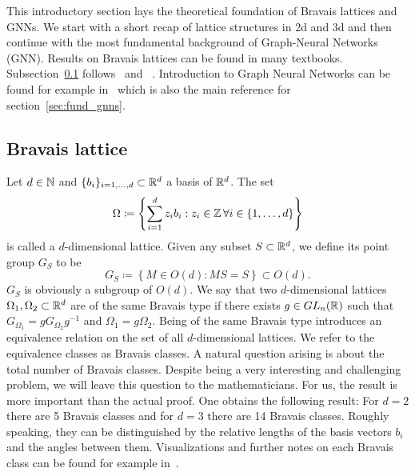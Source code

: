 This introductory section lays the theoretical foundation of Bravais lattices and GNNs. 
We start with a short recap of lattice structures in 2d and 3d and then continue with 
the most fundamental background of Graph-Neural Networks (GNN). 
Results on Bravais lattices can be found in many textbooks. Subsection~\ref{sec:brav_latt} follows~\cite{Schwarzenberger} and ~\cite{symGroupsApplications}.
Introduction to Graph Neural Networks can be found for example in~\cite{IntroMessagePassing} which is also the main reference for section~\ref{sec:fund_gnns}.

\subsection{Bravais lattice}
\label{sec:brav_latt}
Let $d\in\mathbb{N}$ and $\{b_i\}_{i=1,\dots,d}\subset \mathbb{R}^d$ a basis of $\mathbb{R}^d$. The set 
\begin{equation*}
    \Omega\coloneq\left\{\sum_{i=1}^{d}z_i b_i: z_i\in\mathbb{Z}\,\forall i\in\{1,\dots,d\}\right\}
\end{equation*}
is called a $d$-dimensional lattice. Given any subset $S\subset\mathbb{R}^d$, we define its point group $G_S$ to be
\begin{equation*}
    G_S\coloneq \left\{M\in O(d) : MS=S\right\}\subset O(d).
\end{equation*}
$G_S$ is obviously a subgroup of $O(d)$. We say that two $d$-dimensional lattices $\Omega_1, \Omega_2\subset \mathbb{R}^d$ are of the same Bravais type if
there exists $g\in GL_n(\mathbb{R})$ such that $G_{\Omega_1}=g G_{\Omega_2} g^{-1}$ and $\Omega_1=g\Omega_2$. 
Being of the same Bravais type introduces an equivalence relation on the set of all $d$-dimensional lattices. We refer to the equivalence classes as Bravais classes.
A natural question arising is about the total number of Bravais classes. Despite being a very interesting and challenging problem,
we will leave this question to the mathematicians. For us, the result is more important than the actual proof. One obtains the following result:
For $d=2$ there are 5 Bravais classes and for $d=3$ there are 14 Bravais classes. 
Roughly speaking, they can be distinguished by the relative lengths of the basis vectors $b_i$ and the angles between them.
Visualizations and further notes on each Bravais class can be found for example in~\cite{kittel}.

